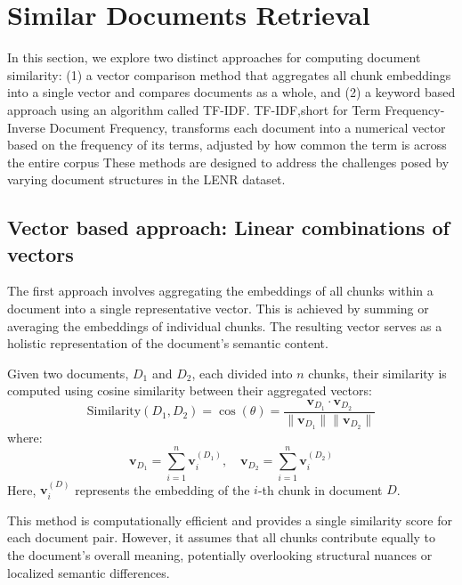 \documentclass[12pt]{article}
\begin{document}
    
\section{Similar Documents Retrieval}

In this section, we explore two distinct approaches for computing document similarity: (1) a vector comparison method that aggregates all chunk embeddings into a single vector and compares documents as a whole, and (2) a keyword based approach using an algorithm called TF-IDF. 
TF-IDF,short for Term Frequency-Inverse Document Frequency, transforms each document into a numerical vector based on the frequency of its terms, adjusted by how common the term is across the entire corpus These methods are designed to address the challenges posed by varying document structures in the LENR dataset.

\subsection{Vector based approach: Linear combinations of vectors}

The first approach involves aggregating the embeddings of all chunks within a document into a single representative vector. This is achieved by summing or averaging the embeddings of individual chunks. The resulting vector serves as a holistic representation of the document's semantic content.

Given two documents, \(D_1\) and \(D_2\), each divided into \(n\) chunks, their similarity is computed using cosine similarity between their aggregated vectors:
\[
\text{Similarity}(D_1, D_2) = \cos(\theta) = \frac{\mathbf{v}_{D_1} \cdot \mathbf{v}_{D_2}}{\|\mathbf{v}_{D_1}\| \|\mathbf{v}_{D_2}\|}
\]
where:
\[
\mathbf{v}_{D_1} = \sum_{i=1}^{n} \mathbf{v}_{i}^{(D_1)}, \quad \mathbf{v}_{D_2} = \sum_{i=1}^{n} \mathbf{v}_{i}^{(D_2)}
\]
Here, \(\mathbf{v}_i^{(D)}\) represents the embedding of the \(i\)-th chunk in document \(D\).

This method is computationally efficient and provides a single similarity score for each document pair. However, it assumes that all chunks contribute equally to the document's overall meaning, potentially overlooking structural nuances or localized semantic differences.
\end{document}
